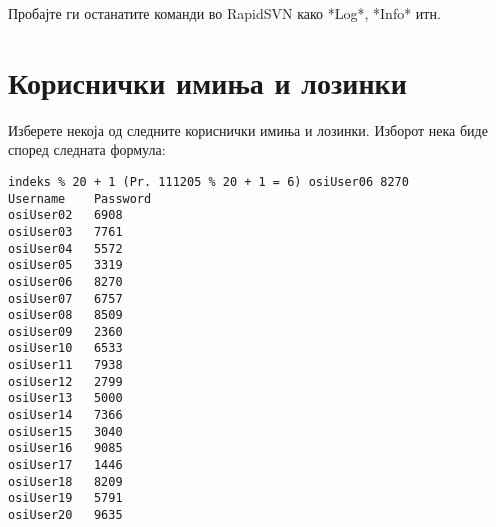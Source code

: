 \documentclass[12pt,a4paper]{exam}
\begin{document}
  Пробајте ги останатите команди во RapidSVN како *Log*, *Info* итн.

\section{Кориснички имиња и лозинки}
Изберете некоја од следните кориснички имиња и лозинки. Изборот нека биде според
следната формула:
\begin{verbatim}
indeks % 20 + 1 (Pr. 111205 % 20 + 1 = 6) osiUser06 8270
Username    Password
osiUser02   6908
osiUser03   7761
osiUser04   5572
osiUser05   3319
osiUser06   8270
osiUser07   6757
osiUser08   8509
osiUser09   2360
osiUser10   6533
osiUser11   7938
osiUser12   2799
osiUser13   5000
osiUser14   7366
osiUser15   3040
osiUser16   9085
osiUser17   1446
osiUser18   8209
osiUser19   5791
osiUser20   9635
\end{verbatim}
\end{document}
